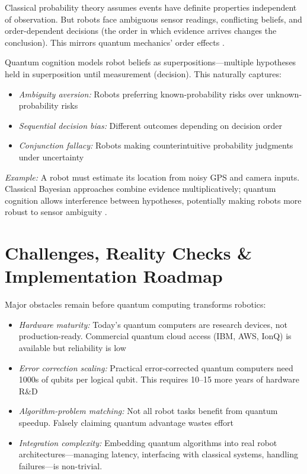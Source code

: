 \documentclass[journal]{IEEEtran}
\begin{document}
Classical probability theory assumes events have definite properties independent of observation. But robots face ambiguous sensor readings, conflicting beliefs, and order-dependent decisions (the order in which evidence arrives changes the conclusion). This mirrors quantum mechanics' order effects \cite{b49, b50, b51}.

Quantum cognition models robot beliefs as superpositions---multiple hypotheses held in superposition until measurement (decision). This naturally captures:

\begin{itemize}
\item \textit{Ambiguity aversion:} Robots preferring known-probability risks over unknown-probability risks \cite{b52, b53}
\item \textit{Sequential decision bias:} Different outcomes depending on decision order \cite{b51, b54}
\item \textit{Conjunction fallacy:} Robots making counterintuitive probability judgments under uncertainty \cite{b55, b56}
\end{itemize}

\textit{Example:} A robot must estimate its location from noisy GPS and camera inputs. Classical Bayesian approaches combine evidence multiplicatively; quantum cognition allows interference between hypotheses, potentially making robots more robust to sensor ambiguity \cite{b1, b57, b58}.

\section{Challenges, Reality Checks \& Implementation Roadmap}

Major obstacles remain before quantum computing transforms robotics:

\begin{itemize}
\item \textit{Hardware maturity:} Today's quantum computers are research devices, not production-ready. Commercial quantum cloud access (IBM, AWS, IonQ) is available but reliability is low \cite{b9, b10, b11}

\item \textit{Error correction scaling:} Practical error-corrected quantum computers need 1000s of qubits per logical qubit. This requires 10--15 more years of hardware R\&D \cite{b13, b14}

\item \textit{Algorithm-problem matching:} Not all robot tasks benefit from quantum speedup. Falsely claiming quantum advantage wastes effort \cite{b59, b60, b61}

\item \textit{Integration complexity:} Embedding quantum algorithms into real robot architectures---managing latency, interfacing with classical systems, handling failures---is non-trivial.
\end{itemize}
\end{document}
